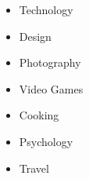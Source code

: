 \begin{itemize}
	\item Technology
	\item Design
	\item Photography
	\item Video Games
	\item Cooking
	\item Psychology
	\item Travel
\end{itemize}
